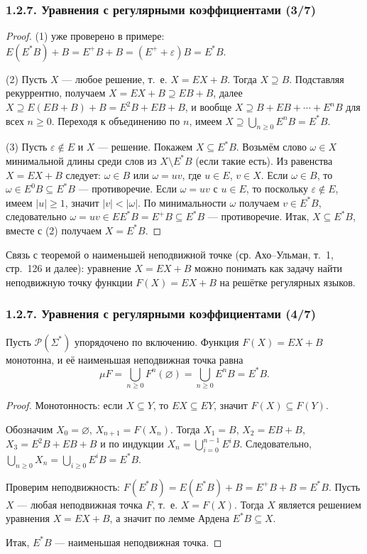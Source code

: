 \documentclass[mathserif,12pt,aspectratio=169]{beamer}
\let\ge\geqslant
\begin{document}
\begin{frame}
\frametitle{1.2.7. Уравнения с регулярными коэффициентами (3/7)}


\begin{proof}
(1) уже проверено в примере: $E(E^*B)+B=E^+B+B=(E^++\varepsilon)B=E^*B$.

(2) Пусть $X$ --- любое решение, т.~е. $X=EX+B$.
Тогда $X\supseteq B$.
Подставляя рекуррентно, получаем
$X=EX+B\supseteq EB + B$,
далее $X\supseteq E(EB+B)+B=E^2B+EB+B$, и вообще
$X\supseteq B+EB+\cdots+E^nB$ для всех $n\ge 0$.
Переходя к объединению по $n$, имеем $X\supseteq \bigcup_{n\ge 0}E^nB=E^*B$.

(3) Пусть $\varepsilon\notin E$ и $X$ --- решение.
Покажем $X\subseteq E^*B$.
Возьмём слово $\omega\in X$ минимальной длины среди слов из $X\setminus E^*B$ (если такие есть).
Из равенства $X=EX+B$ следует: $\omega\in B$ или $\omega=uv$, где $u\in E$, $v\in X$.
Если $\omega\in B$, то $\omega\in E^0B\subseteq E^*B$ --- противоречие.
Если $\omega=uv$ с $u\in E$, то поскольку $\varepsilon\notin E$, имеем $|u|\ge 1$, значит $|v|<|\omega|$.
По минимальности $\omega$ получаем $v\in E^*B$, следовательно $\omega=uv\in EE^*B=E^+B\subseteq E^*B$ --- противоречие.
Итак, $X\subseteq E^*B$, вместе с (2) получаем $X=E^*B$.
\end{proof}

\begin{digress}
Связь с теоремой о наименьшей неподвижной точке (ср. Ахо--Ульман, т.~1, стр.~126 и далее):
уравнение $X=EX+B$ можно понимать как задачу найти неподвижную точку функции
$F(X)=EX+B$ на решётке регулярных языков.
\end{digress}
\end{frame}

\begin{frame}
\frametitle{1.2.7. Уравнения с регулярными коэффициентами (4/7)}


\begin{theorem}
Пусть $\mathcal{P}(\Sigma^*)$ упорядочено по включению.
Функция $F(X)=EX+B$ монотонна, и её наименьшая неподвижная точка равна
\[
\mu F=\bigcup_{n\ge 0}F^n(\varnothing)=\bigcup_{n\ge 0}E^nB=E^*B.
\]
\end{theorem}

\begin{proof}
Монотонность: если $X\subseteq Y$, то $EX\subseteq EY$, значит $F(X)\subseteq F(Y)$.

Обозначим $X_0=\varnothing$, $X_{n+1}=F(X_n)$.
Тогда $X_1=B$, $X_2=EB+B$, $X_3=E^2B+EB+B$ и по индукции
$X_n=\bigcup_{i=0}^{n-1}E^iB$.
Следовательно, $\bigcup_{n\ge 0}X_n=\bigcup_{i\ge 0}E^iB=E^*B$.

Проверим неподвижность:
$F(E^*B)=E(E^*B)+B=E^+B+B=E^*B$.
Пусть $X$ --- любая неподвижная точка $F$, т.~е. $X=F(X)$.
Тогда $X$ является решением уравнения $X=EX+B$, а значит по лемме Ардена
$E^*B\subseteq X$.

Итак, $E^*B$ --- наименьшая неподвижная точка.
\end{proof}
\end{frame}
\end{document}

